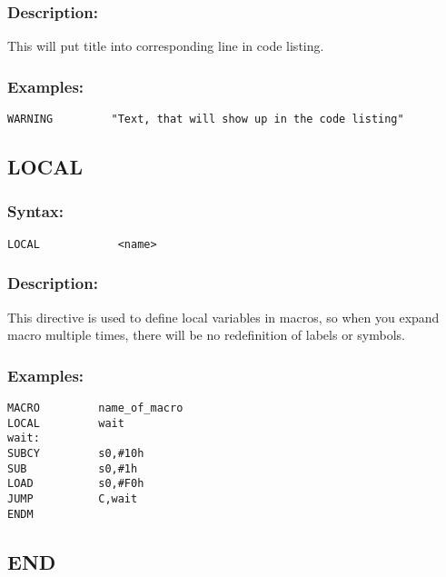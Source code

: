         \subsubsection{Description:}
            This will put title into corresponding line in code listing.

        \subsubsection{Examples:}
            {
                \usecodefont
                \verb'WARNING         "Text, that will show up in the code listing"'
            }

    \subsection{LOCAL}
        \subsubsection{Syntax:}
            \verb'LOCAL            <name>'

        \subsubsection{Description:}
            This directive is used to define local variables in macros, so when you expand macro multiple times, there will be no redefinition of labels or symbols.

        \subsubsection{Examples:}
            {
                \usecodefont
                \verb'MACRO         name_of_macro'\\
                \verb'LOCAL         wait'\\
                \verb'wait:'\\
                \verb'SUBCY         s0,#10h'\\
                \verb'SUB           s0,#1h' \\
                \verb'LOAD          s0,#F0h'\\
                \verb'JUMP          C,wait'\\
                \verb'ENDM'\\
            }

    \subsection{END}
